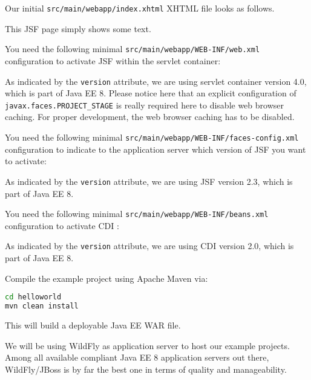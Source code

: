 Our initial \texttt{src/main/webapp/index.xhtml} XHTML file looks as follows.

This JSF page simply shows some text.

You need the following minimal \texttt{src/main/webapp/WEB-INF/web.xml} configuration to activate JSF within the servlet container:

As indicated by the \texttt{version} attribute, we are using servlet container version 4.0, which is part of Java EE 8.
Please notice here that an explicit configuration of \texttt{javax.faces.PROJECT\_STAGE} is really required here to disable web browser caching.
For proper development, the web browser caching has to be disabled.

You need the following minimal \texttt{src/main/webapp/WEB-INF/faces-config.xml} configuration to indicate to the application server which version of JSF you want to activate:

As indicated by the \texttt{version} attribute, we are using JSF version 2.3, which is part of Java EE 8.

You need the following minimal \texttt{src/main/webapp/WEB-INF/beans.xml} configuration to activate CDI \cite{CDI2}:

As indicated by the \texttt{version} attribute, we are using CDI version 2.0, which is part of Java EE 8.

Compile the example project using Apache Maven via:
\begin{lstlisting}[language=bash]
cd helloworld
mvn clean install
\end{lstlisting}
This will build a deployable Java EE WAR file.

We will be using WildFly \cite{WildFly} as application server to host our example projects.
Among all available compliant Java EE 8 application servers out there,
WildFly/JBoss is by far the best one in terms of quality and manageability.

